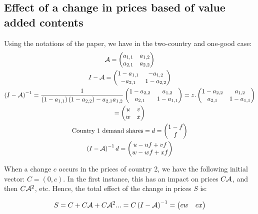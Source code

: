\documentclass[11pt,a4paper]{article} %
\begin{document}
\subsection*{Effect of a change in prices based of value added contents}
Using the notations of the paper, we have in the two-country and one-good case:
\begin{gather*}
\cal {A} = \left(\begin{matrix}a_{1,1}&a_{1,2}\\a_{2,1}&a_{2,2}\end{matrix}\right)
\\
I-\cal {A}=\left(\begin{matrix}1-a_{1,1}&-a_{1,2}\\-a_{2,1}&1-a_{2,2}\end{matrix}\right)
\\
\left(I-\cal {A}\right)^{-1}=\frac{1}{\left(1-a_{1,1}\right)\left(1-a_{2,2}\right)-a_{2,1}a_{1,2}}\left(\begin{matrix}1-a_{2,2}&a_{1,2}\\a_{2,1}&1-a_{1,1}\end{matrix}\right) =z.\left(\begin{matrix}1-a_{2,2}&a_{1,2}\\a_{2,1}&1-a_{1,1}\end{matrix}\right) \\ 
=\left(\begin{matrix}u&v\\w&x\end{matrix}\right)
\\
\text{Country 1 demand shares}=d=\left(\begin{matrix}1-f\\f\end{matrix}\right) \\
\left(I-\cal {A}\right)^{-1}d=\left(\begin{matrix}u-uf+vf\\w-wf+xf\end{matrix}\right)
\end{gather*}

When a change $c$ occurs in the prices of country 2, we have the following initial vector: $C=\left(0,c\right)$.
In the first instance, this has an impact on prices $C\cal {A}$, and then $C{\cal{A}}^{2}$, etc.
Hence, the total effect of the change in prices $S$ is: 


\begin{equation*}
S=C+C{\cal{A}}+C{\cal{A}}^{2}...=C\left(I-{\cal{A}}\right)^{-1}=\left(\begin{matrix}cw  &   cx\end{matrix}\right)
\end{equation*}
\end{document}
